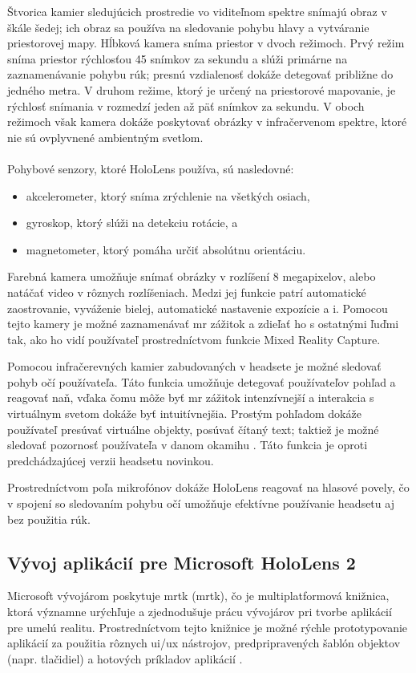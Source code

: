 Štvorica kamier sledujúcich prostredie vo viditeľnom spektre snímajú obraz v škále šedej; ich obraz sa používa na sledovanie pohybu hlavy a vytváranie priestorovej mapy.
Hĺbková kamera sníma priestor v dvoch režimoch. Prvý režim sníma priestor rýchlosťou 45 snímkov za sekundu a slúži primárne na zaznamenávanie pohybu rúk; presnú vzdialenosť
dokáže detegovať približne do jedného metra. V druhom režime, ktorý je určený na priestorové mapovanie, je rýchlosť snímania v rozmedzí jeden až päť snímkov za sekundu.
V oboch režimoch však kamera dokáže poskytovať obrázky v infračervenom spektre, ktoré nie sú ovplyvnené ambientným svetlom.
\\\\
\noindent Pohybové senzory, ktoré HoloLens používa, sú nasledovné:
\begin{itemize}
  \item akcelerometer, ktorý sníma zrýchlenie na všetkých osiach,
  \item gyroskop, ktorý slúži na detekciu rotácie, a
  \item magnetometer, ktorý pomáha určiť absolútnu orientáciu.
\end{itemize}
Farebná kamera umožňuje snímať obrázky v rozlíšení 8 megapixelov, alebo natáčať video v rôznych rozlíšeniach. Medzi jej funkcie patrí automatické zaostrovanie, vyváženie bielej,
automatické nastavenie expozície a i. Pomocou tejto kamery je možné zaznamenávať \acrshort{mr} zážitok a zdieľať ho s ostatnými ľuďmi tak, ako ho vidí používateľ 
prostredníctvom funkcie Mixed Reality Capture.

Pomocou infračerevných kamier zabudovaných v headsete je možné sledovať pohyb očí používateľa. Táto funkcia umožňuje detegovať používateľov pohľad a reagovať naň, vďaka čomu 
môže byť \acrshort{mr} zážitok intenzívnejší a interakcia s virtuálnym svetom dokáže byť intuitívnejšia. 
Prostým pohľadom dokáže používateľ presúvať virtuálne objekty, posúvať čítaný text; taktiež je možné sledovať pozornosť používateľa v danom okamihu \cite{EyeTrackingHoloLens}.
Táto funkcia je oproti predchádzajúcej verzii headsetu novinkou.

Prostredníctvom poľa mikrofónov dokáže HoloLens reagovať na hlasové povely, čo v spojení so sledovaním pohybu očí umožňuje efektívne používanie headsetu aj bez použitia rúk.

\subsection{Vývoj aplikácií pre Microsoft HoloLens 2}
Microsoft vývojárom poskytuje \acrshort{mrtk} (\acrlong{mrtk}), čo je multiplatformová knižnica, ktorá významne urýchľuje a zjednodušuje prácu vývojárov pri tvorbe aplikácií
pre umelú realitu. Prostredníctvom tejto knižnice je možné rýchle prototypovanie aplikácií za použitia rôznych \acrshort{ui}/\acrshort{ux} nástrojov, predpripravených šablón 
objektov (napr. tlačidiel) a hotových príkladov aplikácií \cite{valoremreplyWaysMicrosoftMixed}. 

